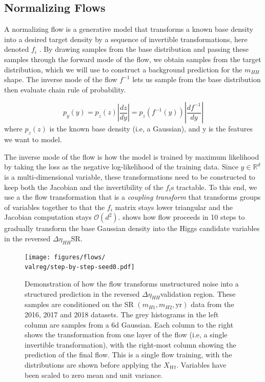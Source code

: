 \subsection{Normalizing Flows}
\label{subsec:nfs}

\def\valreg{rev_deta}
\def\vallabel{reversed $\Delta \eta_{HH}$}

A normalizing flow is a generative model that transforms a known base density into a desired target density by a sequence of invertible transformations, here denoted $f_i$ \cite{1505.05770}.
By drawing samples from the base distribution and passing these samples through the forward mode of the flow, we obtain samples from the target distribution, which we will use to construct a background prediction for the $m_{HH}$ shape.
The inverse mode of the flow $f^{-1}$ lets us sample from the base distribution then evaluate chain rule of probability. 

\begin{equation}
p_y (y) = p_z(z) \left| \frac{dz}{dy} \right| = p_z (f^{-1}(y)) \left| \frac{df^{-1}}{dy} \right|
\end{equation}
where $p_z(z)$ is the known base density (i.e, a Gaussian), and y is the features we want to model. 

The inverse mode of the flow is how the model is trained by maximum likelihood by taking the loss as the negative log-likelihood of the training data.
Since $y \in \mathbb{R}^d$ is a multi-dimensional variable, these transformations need to be constructed to keep both the Jacobian and the invertibility of the $f_i$s tractable.
To this end, we use a the flow transformation that is a \emph{coupling transform} that transforms groups of variables together to that the $f_i$ matrix stays lower triangular and the Jacobian computation stays $\mathcal{O}(d^2)$.
\Fig{\ref{fig:flow-steps-\valreg}} shows how flow proceeds in 10 steps to gradually transform the base Gaussian density into the Higgs candidate variables in the \vallabel SR.

\begin{figure}[hbt]
    \centering
    \texttt{[image: figures/flows/\\valreg/step-by-step-seed0.pdf]} 
    \caption{Demonstration of how the flow transforms unstructured noise into a structured prediction in the \vallabel validation region.
    		 These samples are conditioned on the SR $(m_{H1}, m_{H2}, \text{yr} )$ data from the 2016, 2017 and 2018 datasets.
    		 The grey histograms in the left column are samples from a 6d Gaussian.
		 Each column to the right shows the transformation from one layer of the flow (i.e, a single invertible transformation), with the right-most column showing the prediction of the final flow. 
		 This is a single flow training, with the distributions are shown before applying the $X_{Wt}$.
    		 Variables have been scaled to zero mean and unit variance. }  
	 \label{fig:flow-steps-\valreg}
\end{figure}


